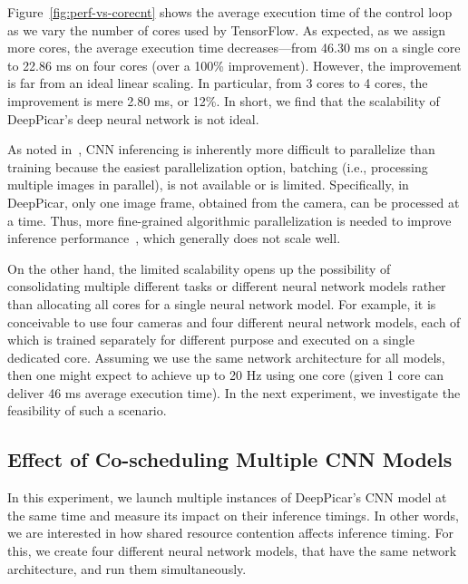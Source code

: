 Figure~\ref{fig:perf-vs-corecnt} shows the average execution time of
the control loop as we vary the number of cores used by
TensorFlow. As expected, as we assign more cores, the average execution
time decreases---from 46.30 ms on a single core to 22.86 ms on four
cores (over a 100\% improvement). However, the improvement is far from an ideal
linear scaling. In particular, from 3 cores to 4 cores, the
improvement is mere 2.80 ms, or 12\%. In short, we find that the
scalability of DeepPicar's deep neural network is not ideal.

As noted in~\cite{NVIDIA2015}, CNN inferencing is inherently more
difficult to parallelize than training because the easiest
parallelization option, batching (i.e., processing multiple images in
parallel), is not available or is limited. Specifically, in DeepPicar,
only one image frame, obtained from the camera, can be processed at a
time. Thus, more fine-grained algorithmic parallelization is needed to
improve inference performance~\cite{NVIDIA2015}, which generally does
not scale well. 

On the other hand, the limited scalability opens up the possibility of
consolidating multiple different tasks or different neural network
models rather than allocating all cores for a single neural network
model.
For example, it is conceivable to use four cameras and four different
neural network models, each of which is trained separately for
different purpose and executed on a single dedicated core.
Assuming we use the same network
architecture for all models, then one might expect to achieve up to
20 Hz using one core (given 1 core can deliver 46 ms average
execution time).
In the next experiment, we investigate the
feasibility of such a scenario.

\subsection{Effect of Co-scheduling Multiple CNN Models}

In this experiment, we launch multiple instances of DeepPicar's CNN
model at the same time and measure its impact on their inference
timings. In other words, we are interested in how shared resource
contention affects inference timing. For this, we create four different
neural network models, that have the same network architecture, and
run them simultaneously.

